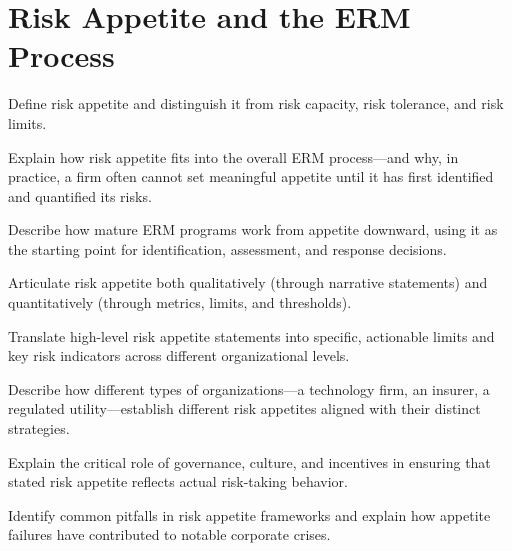 \documentclass[11pt,openany]{book}
\begin{document}
\setcounter{chapter}{4}
\chapter{Risk Appetite and the ERM Process}
\label{chap:risk-appetite}

\begin{learningobjectives}
  \item Define risk appetite and distinguish it from risk capacity, risk
        tolerance, and risk limits.
  \item Explain how risk appetite fits into the overall ERM process---and why,
        in practice, a firm often cannot set meaningful appetite until it has
        first identified and quantified its risks.
  \item Describe how mature ERM programs work from appetite downward, using it
        as the starting point for identification, assessment, and response
        decisions.
  \item Articulate risk appetite both qualitatively (through narrative
        statements) and quantitatively (through metrics, limits, and
        thresholds).
  \item Translate high-level risk appetite statements into specific, actionable
        limits and key risk indicators across different organizational levels.
  \item Describe how different types of organizations---a technology firm, an
        insurer, a regulated utility---establish different risk appetites
        aligned with their distinct strategies.
  \item Explain the critical role of governance, culture, and incentives in
        ensuring that stated risk appetite reflects actual risk-taking behavior.
  \item Identify common pitfalls in risk appetite frameworks and explain how
        appetite failures have contributed to notable corporate crises.
\end{learningobjectives}
\end{document}
